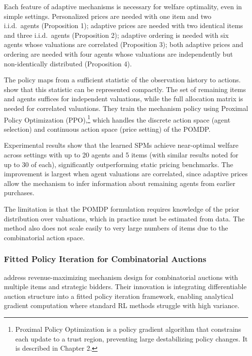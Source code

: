 \begin{theorem}
Each feature of adaptive mechanisms is necessary for welfare optimality, even in simple settings. Personalized prices are needed with one item and two i.i.d.\ agents (Proposition 1); adaptive prices are needed with two identical items and three i.i.d.\ agents (Proposition 2); adaptive ordering is needed with six agents whose valuations are correlated (Proposition 3); both adaptive prices and ordering are needed with four agents whose valuations are independently but non-identically distributed (Proposition 4).
\end{theorem}

The policy maps from a sufficient statistic of the observation history to actions. \citet{BreroEtAl2021} show that this statistic can be represented compactly. The set of remaining items and agents suffices for independent valuations, while the full allocation matrix is needed for correlated valuations. They train the mechanism policy using Proximal Policy Optimization (PPO),\footnote{Proximal Policy Optimization \citep{Schulman2017} is a policy gradient algorithm that constrains each update to a trust region, preventing large destabilizing policy changes. It is described in Chapter 2.} which handles the discrete action space (agent selection) and continuous action space (price setting) of the POMDP.

Experimental results show that the learned SPMs achieve near-optimal welfare across settings with up to 20 agents and 5 items (with similar results noted for up to 30 of each), significantly outperforming static pricing benchmarks. The improvement is largest when agent valuations are correlated, since adaptive prices allow the mechanism to infer information about remaining agents from earlier purchases.

The limitation is that the POMDP formulation requires knowledge of the prior distribution over valuations, which in practice must be estimated from data. The method also does not scale easily to very large numbers of items due to the combinatorial action space.


\subsubsection{Fitted Policy Iteration for Combinatorial Auctions}

\citet{RavindranathEtAl2024} address revenue-maximizing mechanism design for combinatorial auctions with multiple items and strategic bidders. Their innovation is integrating differentiable auction structure into a fitted policy iteration framework, enabling analytical gradient computation where standard RL methods struggle with high variance.

